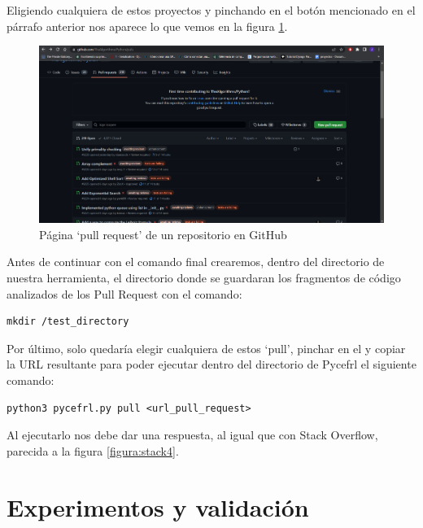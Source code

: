 \documentclass[a4paper, 12pt]{book}
\begin{document}
Eligiendo cualquiera de estos proyectos y pinchando en el botón mencionado en el párrafo anterior nos aparece lo que vemos en la figura \ref{figura:git4}.

\begin{figure}
    \includegraphics[bb=0 0 800 600, width=12cm, keepaspectratio]{img/git4}
    \caption{Página `pull request' de un repositorio en GitHub}
    \label{figura:git4}
 \end{figure}
 
Antes de continuar con el comando final crearemos, dentro del directorio de nuestra herramienta, el directorio donde se guardaran los fragmentos de código analizados de los Pull Request con el comando:

\begin{verbatim}
mkdir /test_directory
\end{verbatim}
 
Por último, solo quedaría elegir cualquiera de estos `pull', pinchar en el y copiar la URL resultante para poder ejecutar dentro del directorio de Pycefrl el siguiente comando:

\begin{verbatim}
python3 pycefrl.py pull <url_pull_request>
\end{verbatim}

Al ejecutarlo nos debe dar una respuesta, al igual que con Stack Overflow, parecida a la figura \ref{figura:stack4}. 


\cleardoublepage
\chapter{Experimentos y validación}
\end{document}
